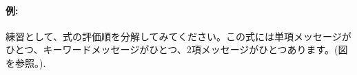 \documentclass[a4paper,10pt,twoside]{book}
\begin{document}




\paragraph{例:} 練習として、式の評価順を分解してみてください。この式には単項メッセージがひとつ、キーワードメッセージがひとつ、2項メッセージがひとつあります。(図を参照。).

\end{document}
